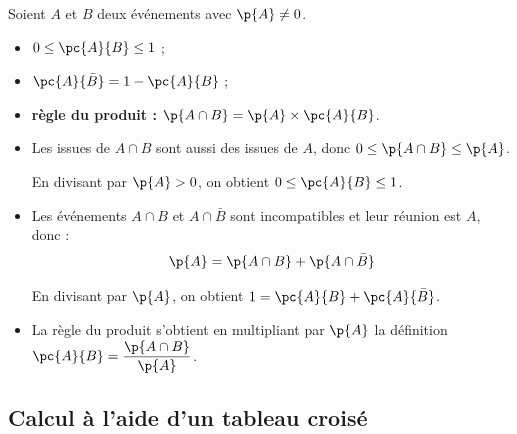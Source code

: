 \begin{prop}
	Soient $A$ et $B$ deux événements avec $\p{A} \neq 0$.

	\begin{itemize}
		\item $0 \leq \pc{A}{B} \leq 1$ ;
		\item $\pc{A}{\bar{B}} = 1 - \pc{A}{B}$ ;
		\item \textbf{règle du produit :} $\p{A \cap B} = \p{A} \times \pc{A}{B}$.
	\end{itemize}
\end{prop}

\begin{demo}
	\nline
	\begin{itemize}
		\item Les issues de $A \cap B$ sont aussi des issues de $A$, donc $0 \leq \p{A \cap B} \leq \p{A}$.

		      En divisant par $\p{A} > 0$, on obtient $0 \leq \pc{A}{B} \leq 1$.
		\item Les événements $A \cap B$ et $A \cap \bar{B}$ sont incompatibles et leur réunion est $A$, donc :
		      \[
			      \p{A} = \p{A \cap B} + \p{A \cap \bar{B}}
		      \]

		      En divisant par $\p{A}$, on obtient $1 = \pc{A}{B} + \pc{A}{\bar{B}}$.
		\item La règle du produit s'obtient en multipliant par $\p{A}$ la définition $\pc{A}{B} = \dfrac{\p{A \cap B}}{\p{A}}$.
	\end{itemize}
\end{demo}

\newpage

\subsection{Calcul à l'aide d'un tableau croisé}

